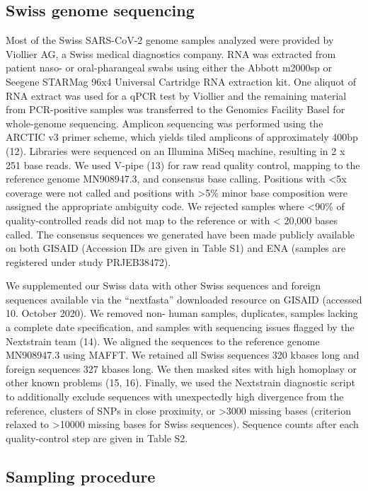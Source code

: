 \documentclass[9pt,twocolumn,twoside,lineno]{pnas-new}
\begin{document}
\subsection{Swiss genome sequencing}
Most of the Swiss SARS-CoV-2 genome samples analyzed were provided by Viollier AG, a Swiss medical diagnostics company. RNA was extracted from patient naso- or oral-pharangeal swabs using either the Abbott m2000sp or Seegene STARMag 96x4 Universal Cartridge RNA extraction kit. One aliquot of RNA extract was used for a qPCR test by Viollier and the remaining material from PCR-positive samples was transferred to the Genomics Facility Basel for whole-genome sequencing. Amplicon sequencing was performed using the ARCTIC v3 primer scheme, which yields tiled amplicons of approximately 400bp (12). Libraries were sequenced on an Illumina MiSeq machine, resulting in 2 x 251 base reads. We used V-pipe (13) for raw read quality control, mapping to the reference genome MN908947.3, and consensus base calling. Positions with <5x coverage were not called and positions with >5\% minor base composition were assigned the appropriate ambiguity code. We rejected samples where <90\% of quality-controlled reads did not map to the reference or with < 20,000 bases called. The consensus sequences we generated have been made publicly available on both GISAID (Accession IDs are given in Table S1) and ENA (samples are registered under study PRJEB38472).

We supplemented our Swiss data with other Swiss sequences and foreign sequences available via the “nextfasta” downloaded resource on GISAID (accessed 10. October 2020). We removed non- human samples, duplicates, samples lacking a complete date specification, and samples with sequencing issues flagged by the Nextstrain team (14). We aligned the sequences to the reference genome MN908947.3 using MAFFT. We retained all Swiss sequences 320 kbases long and foreign sequences 327 kbases long. We then masked sites with high homoplasy or other known problems (15, 16). Finally, we used the Nextstrain diagnostic script to additionally exclude sequences with unexpectedly high divergence from the reference, clusters of SNPs in close proximity, or >3000 missing bases (criterion relaxed to >10000 missing bases for Swiss sequences). Sequence counts after each quality-control step are given in Table S2.

\subsection{Sampling procedure}
\end{document}
